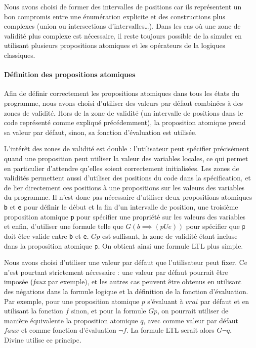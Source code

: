 Nous avons choisi de former des intervalles de positions car ils
représentent un bon compromis entre une énumération explicite et des
constructions plus complexes (union ou intersections
d'intervalles\ldots{}). Dans les cas où une zone de validité plus
complexe est nécessaire, il reste toujours possible de la simuler en
utilisant plusieurs propositions atomiques et les opérateurs de la
logiques classiques.

\paragraph{Définition des propositions atomiques}

Afin de définir correctement les propositions atomiques dans tous les
états du programme, nous avons choisi d'utiliser des valeurs par défaut
combinées à des zones de validité. Hors de la zone de validité (un
intervalle de positions dans le code représenté comme expliqué
précédemment), la proposition atomique prend sa valeur par défaut,
sinon, sa fonction d'évaluation est utilisée.

L'intérêt des zones de validité est double : l'utilisateur peut
spécifier précisément quand une proposition peut utiliser la valeur des
variables locales, ce qui permet en particulier d'attendre qu'elles
soient correctement initialisées. Les zones de validités permettent
aussi d'utiliser des positions du code dans la spécification, et de lier
directement ces positions à une propositions sur les valeurs des
variables du programme. Il n'est donc pas nécessaire d'utiliser deux
propositions atomiques \texttt{b} et \texttt{e} pour définir le
début et la fin d'un intervalle de position, une troisième proposition
atomique \texttt{p} pour spécifier une propriété sur les valeurs des
variables et enfin, d'utiliser une formule telle que
\(G (b \implies (p U e))\) pour spécifier que \texttt{p} doit être
valide entre \texttt{b} et \texttt{e}. \(G p\) est suffisant, la
zone de validité étant incluse dans la proposition atomique
\texttt{p}. On obtient ainsi une formule LTL plus simple.

Nous avons choisi d'utiliser une valeur par défaut que l'utilisateur
peut fixer. Ce n'est pourtant strictement nécessaire : une valeur par
défaut pourrait être imposée (\emph{faux} par exemple), et les autres
cas peuvent être obtenus en utilisant des négations dans la formule
logique et la définition de la fonction d'évaluation. Par exemple, pour
une proposition atomique \(p\) s'évaluant à \(vrai\) par défaut et en
utilisant la fonction \(f\) sinon, et pour la formule \(G p\), on
pourrait utiliser de manière équivalente la proposition atomique \(q\),
avec comme valeur par défaut \(faux\) et comme fonction d'évaluation
\(\lnot f\). La formule LTL serait alors \(G \lnot q\). Divine
\cite{Divine_LTL} utilise ce principe.

